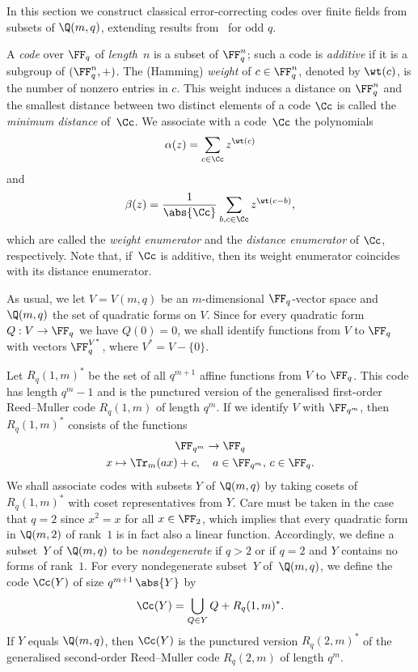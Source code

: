 In this section we construct classical error-correcting codes over finite fields from subsets of $\Q(m,q)$, extending results from~\cite{Sch2015} for odd $q$.
\par
A \emph{code} over $\FF_q$ of \emph{length}~$n$ is a subset of $\FF_q^n$; such a code is \emph{additive} if it is a subgroup of $(\FF_q^n,+)$. The (Hamming) \emph{weight} of $c\in\FF_q^n$, denoted by $\wt(c)$, is the number of nonzero entries in $c$. This weight induces a distance on $\FF_q^n$ and the smallest distance between two distinct elements of a code $\Cc$ is called the \emph{minimum distance} of~$\Cc$. We associate with a code~$\Cc$ the polynomials
\[
\alpha(z)=\sum_{c\in\Cc}z^{\wt(c)}
\]
and
\[
\beta(z)=\frac{1}{\abs{\Cc}}\sum_{b,c\in\Cc}z^{\wt(c-b)},
\]
which are called the \emph{weight enumerator} and the \emph{distance enumerator} of $\Cc$, respectively. Note that, if~$\Cc$ is additive, then its weight enumerator coincides with its distance enumerator. 
\par
As usual, we let $V=V(m,q)$ be an $m$-dimensional $\FF_q$-vector space and $\Q(m,q)$ the set of quadratic forms on $V$. Since for every quadratic form $Q:V\to\FF_q$ we have $Q(0)=0$, we shall identify functions from $V$ to $\FF_q$ with vectors $\FF_q^{V^*}$, where $V^*=V-\{0\}$.
\par
Let $R_q(1,m)^*$ be the set of all $q^{m+1}$ affine functions from $V$ to $\FF_q$. This code has length $q^m-1$ and is the punctured version of the generalised first-order Reed--Muller code $R_q(1,m)$ of length $q^m$. If we identify $V$ with $\FF_{q^m}$, then $R_q(1,m)^*$ consists of the functions
\begin{gather*}
\FF_{q^m}\to\FF_q\\
x\mapsto\Tr_m(ax)+c,\quad a\in\FF_{q^m},\,c\in\FF_q.
\end{gather*}
We shall associate codes with subsets $Y$ of $\Q(m,q)$ by taking cosets of $R_q(1,m)^*$ with coset representatives from $Y$. Care must be taken in the case that $q=2$ since $x^2=x$ for all $x\in\FF_2$, which implies that every quadratic form in $\Q(m,2)$ of rank~$1$ is in fact also a linear function. Accordingly, we define a subset~$Y$ of $\Q(m,q)$ to be \emph{nondegenerate} if $q>2$ or if $q=2$ and $Y$ contains no forms of rank~$1$. For every nondegenerate subset~$Y$ of~$\Q(m,q)$, we define the code $\Cc(Y)$ of size $q^{m+1}\,\abs{Y}$ by
\[
\Cc(Y)=\bigcup_{Q\in Y}Q+R_q(1,m)^*.
\]
If $Y$ equals $\Q(m,q)$, then $\Cc(Y)$ is the punctured version $R_q(2,m)^*$ of the generalised second-order Reed--Muller code $R_q(2,m)$ of length $q^m$.
